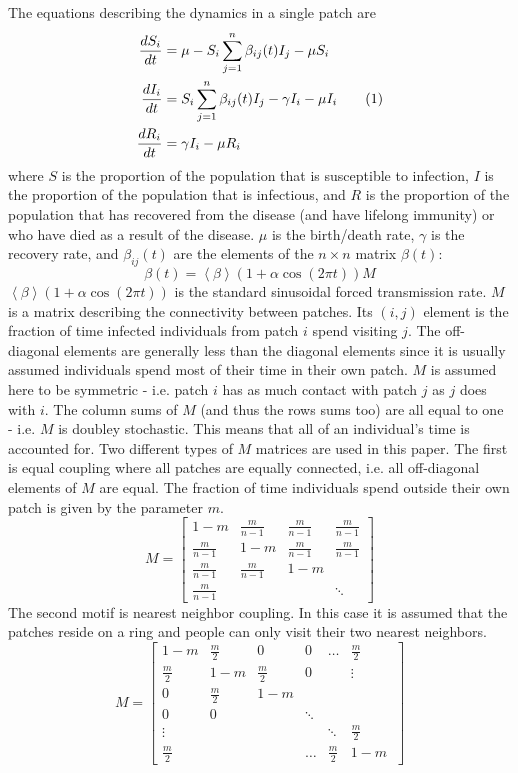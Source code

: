 \documentclass[twocolumn,nofootinbib,showkeys,twoside,floatfix,unsortedaddress,flushbottom,10pt,aps,pra]{report}
\newcommand\numberthis{\addtocounter{equation}{1}\tag{\theequation}}
\begin{document}
The equations describing the dynamics in a single patch are
\begin{align*}
  \frac{dS_i}{dt} &= \mu - S_i\sum\limits_{j=1}^{n}\beta_{ij}(t) I_j -\mu S_i \\ 
  \frac{dI_i}{dt} &= S_i\sum\limits_{j=1}^{n}\beta_{ij}(t) I_j -\gamma I_i - \mu I_i  \numberthis \label{model} \\
  \frac{dR_i}{dt} &= \gamma I_i -\mu R_i      
\end{align*}
where $S$ is the proportion of the population that is susceptible to infection, $I$ is the proportion of the population that is infectious, and $R$ is the proportion of the population that has recovered from the disease (and  have lifelong immunity) or who have died as a result of the disease. $\mu$ is the birth/death rate, $\gamma$ is the recovery rate, and $\beta_{ij}(t)$ are the elements of the $n\times n$ matrix $\beta(t)$:
\begin{equation}
  \beta(t) = \left < \beta \right > (1+\alpha \cos(2\pi t))M
\end{equation}
$\left < \beta \right > (1+\alpha \cos(2\pi t))$ is the standard sinusoidal forced transmission rate. $M$ is a matrix describing the connectivity between patches. Its $(i,j)$ element is the fraction of time infected individuals from patch $i$ spend visiting $j$. The off-diagonal elements are generally less than the diagonal elements since it is usually assumed individuals spend most of their time in their own patch. $M$ is assumed here to be symmetric - i.e. patch $i$ has as much contact with patch $j$ as $j$ does with $i$. The column sums of $M$ (and thus the rows sums too) are all equal to one - i.e. $M$ is doubley stochastic. This means that all of an individual's time is accounted for.
Two different types of $M$ matrices are used in this paper. The first is equal coupling where all patches are equally connected, i.e. all off-diagonal elements of $M$ are equal. The fraction of time individuals spend outside their own patch is given by the parameter $m$.
\[
M =
\begin{bmatrix}
  1-m & \frac{m}{n-1} & \frac{m}{n-1} & \frac{m}{n-1} \\
  \frac{m}{n-1} & 1-m & \frac{m}{n-1} & \frac{m}{n-1}  \\
  \frac{m}{n-1} & \frac{m}{n-1} & 1-m &  \\
  \frac{m}{n-1} &  &  & \ddots 
\end{bmatrix}
\]
The second motif is nearest neighbor coupling. In this case it is assumed that the patches reside on a ring and people can only visit their two nearest neighbors.
\[
M =
\begin{bmatrix}
  1-m & \frac{m}{2} & 0 & 0 & \dots & \frac{m}{2} \\
  \frac{m}{2} & 1-m & \frac{m}{2} & 0 & & \vdots \\
  0 & \frac{m}{2} & 1-m &  \\
  0 & 0 & & \ddots \\
  \vdots & & & & \ddots & \frac{m}{2} \\
  \frac{m}{2} &  & & \dots & \frac{m}{2} & 1-m \ 
\end{bmatrix}
\]
\end{document}
